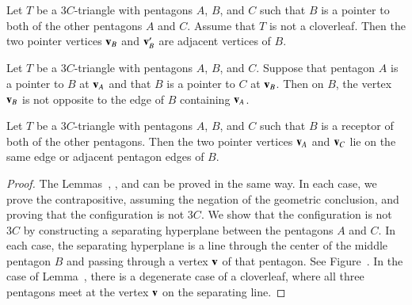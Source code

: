 \begin{lemma} 
Let $T$ be a $3C$-triangle with pentagons $A$, $B$, and $C$ such that
$B$ is a pointer to both of the other pentagons $A$ and $C$.  
Assume that $T$ is not a cloverleaf.
Then the two pointer vertices ${\mathbf v}_B$ and ${\mathbf v}_B'$ are adjacent
vertices of $B$.
\end{lemma}

\begin{lemma}  
Let $T$ be a $3C$-triangle with pentagons $A$, $B$, and $C$.
Suppose that pentagon
$A$ is a pointer to $B$ at ${\mathbf v}_A$ and that $B$ is a pointer to $C$
at ${\mathbf v}_B$.  Then on $B$, the vertex
${\mathbf v}_B$ is not opposite to the edge of $B$ containing
${\mathbf v}_A$.
\end{lemma}

\begin{lemma} 
Let $T$ be a $3C$-triangle with pentagons $A$, $B$, and $C$ 
such that $B$ is a receptor of both of
  the other pentagons.  Then the two pointer vertices
  ${\mathbf v}_A$ and ${\mathbf v}_C$ lie on the same edge or adjacent pentagon edges of
  $B$. 
\end{lemma}





\begin{proof} The Lemmas~, , and
   can be proved in the same way.  In each case, we
  prove the contrapositive, assuming the negation of the geometric
  conclusion, and proving that the configuration is not $3C$.  We show
  that the configuration is not $3C$ by constructing a separating
  hyperplane between the pentagons $A$ and $C$.  In each case, the
  separating hyperplane is a line through the center of the middle
  pentagon $B$ and passing through a vertex ${\mathbf v}$ of that pentagon.  See
  Figure~.  In the case of Lemma~, there
  is a degenerate case of a cloverleaf, where all three pentagons meet
  at the vertex ${\mathbf v}$ on the separating line.
\end{proof}

